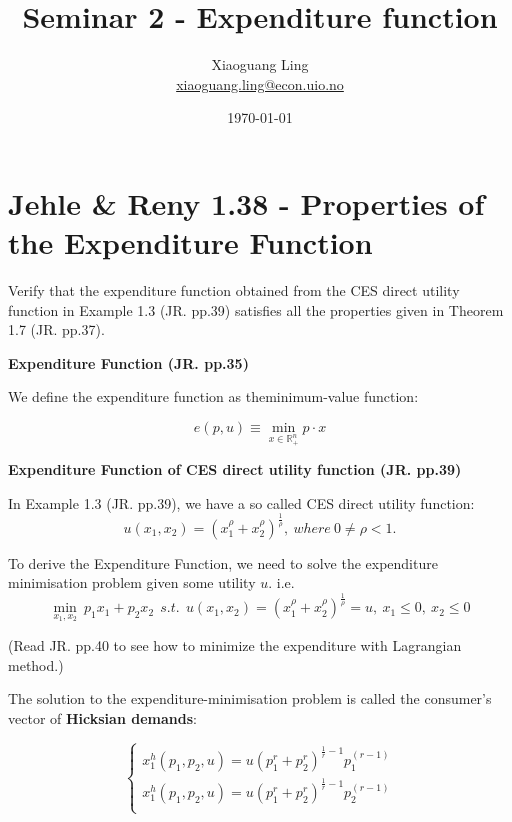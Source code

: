 \documentclass{article}
\title{Seminar 2 - Expenditure function}
\author{Xiaoguang Ling \\  \href{xiaoguang.ling@econ.uio.no}{xiaoguang.ling@econ.uio.no}}
\date{\today}
\newcommand{\R}{\mathbb{R}}
\begin{document}
\maketitle

\section{Jehle \& Reny 1.38 - Properties of the Expenditure Function}
Verify that the expenditure function obtained from the CES direct utility function in Example 1.3 
(JR. pp.39) satisfies all the properties given in Theorem 1.7 (JR. pp.37).

\begin{mdframed}[backgroundcolor=blue!20,linecolor=white]

\textbf{Expenditure Function (JR. pp.35)}

\medskip

We define the expenditure function as theminimum-value function:

$$e(p, u) \equiv \min_{x \in \R^n_+} p \cdot x$$

\textbf{Expenditure Function of CES direct utility function (JR. pp.39)}

\medskip

In Example 1.3 (JR. pp.39), we have a so called CES  direct utility function:
$$u(x_1, x_2) = (x_1^{\rho} + x_2^{\rho})^{\frac{1}{\rho}},\ where \ 0 \ne \rho<1.$$

To derive the Expenditure Function, we need to solve the expenditure minimisation problem
given some utility $u$. i.e.
$$\min_{x_1,x_2} \ p_1x_1 + p_2x_2 \ \ s.t.  \ \ u(x_1, x_2) = (x_1^{\rho} + x_2^{\rho})^{\frac{1}{\rho}} = u, \ x_1 \le 0, \ x_2 \le 0$$

(Read JR. pp.40 to see how to minimize the expenditure with Lagrangian method.)

\medskip

The solution to the expenditure-minimisation problem is called the consumer’s
vector of \textbf{Hicksian demands}:

\begin{equation}
    \begin{cases}
    x_1^h(p_1,p_2,u) = u(p_1^{r} + p_2^{r})^{\frac{1}{r}-1} p_1^(r-1) \\	
    x_1^h(p_1,p_2,u) = u(p_1^{r} + p_2^{r})^{\frac{1}{r}-1} p_2^(r-1) \\	
    \end{cases}
    \label{eq:1_38_hicks}   
\end{equation}


\end{mdframed}
\end{document}
